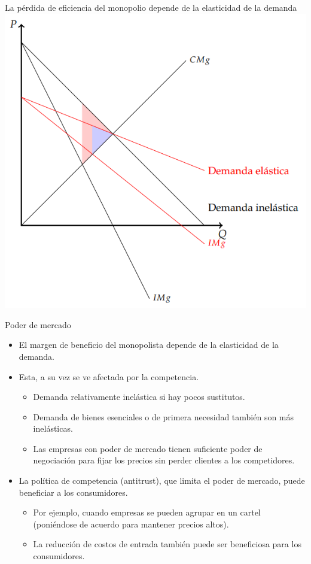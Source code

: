 \documentclass{beamer}
\begin{document}
\begin{frame}{La pérdida de eficiencia del
monopolio depende de la elasticidad de
la demanda}
    \centering
    \includegraphics[scale=0.55]{../Figures/C22.9.png}
\end{frame}
\begin{frame}{Poder de mercado}
    \begin{itemize}
        \item El margen de beneficio del monopolista depende de la elasticidad de la demanda.
        \item Esta, a su vez se ve afectada por la competencia.
        \begin{itemize}
            \item Demanda relativamente inelástica si hay pocos sustitutos.
            \item Demanda de bienes esenciales o de primera necesidad también son más inelásticas.
            \item Las empresas con poder de mercado tienen suficiente poder de negociación para fijar los precios sin perder clientes a los competidores.
        \end{itemize}
        \item La política de competencia (antitrust), que limita el poder de mercado, puede beneficiar a los consumidores.
        \begin{itemize}
            \item Por ejemplo, cuando empresas se pueden agrupar en un cartel (poniéndose de acuerdo para mantener precios altos).
            \item La reducción de costos de entrada también puede ser beneficiosa para los consumidores.
        \end{itemize}
    \end{itemize}
\end{frame}
\end{document}
